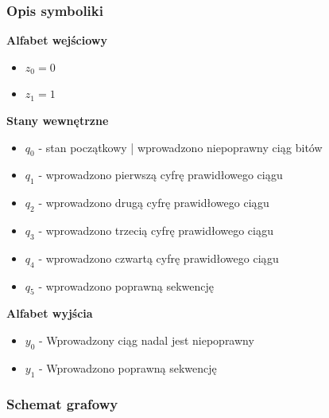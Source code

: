 \documentclass[a4paper,12pt]{extarticle}  %
\begin{document}
\subsubsection{Opis symboliki}
\textbf{Alfabet wejściowy}
\begin{itemize}
	\item $z_0 = 0$
	\item $z_1 = 1$
\end{itemize}
\textbf{Stany wewnętrzne}
\begin{itemize}
	\item $q_0$ - stan początkowy | wprowadzono niepoprawny ciąg bitów
	\item $q_1$ - wprowadzono pierwszą cyfrę prawidłowego ciągu
	\item $q_2$ - wprowadzono drugą cyfrę prawidłowego ciągu
	\item $q_3$ - wprowadzono trzecią cyfrę prawidłowego ciągu
	\item $q_4$ - wprowadzono czwartą cyfrę prawidłowego ciągu
	\item $q_5$ - wprowadzono poprawną sekwencję
\end{itemize}
\textbf{Alfabet wyjścia}
\begin{itemize}
	\item $y_0$ - Wprowadzony ciąg nadal jest niepoprawny
	\item $y_1$ - Wprowadzono poprawną sekwencję
\end{itemize}
\subsubsection{Schemat grafowy}
\begin{figure}[H]
	\centering
\end{figure}
\end{document}
